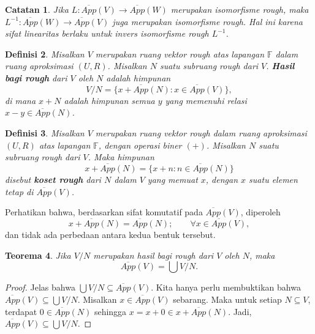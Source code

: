 \documentclass[a4paper,11pt]{article}
\theoremstyle{plain}
\newtheorem{definisi}{Definisi}
\newtheorem{catatan}[definisi]{Catatan}
\newtheorem{teorema}[definisi]{Teorema}
\newcommand{\F}{\mathbb{F}}
\newcommand{\upp}[1]{\overline{App}(#1)}
\begin{document}
\begin{catatan}\label{rem:28}
      Jika $L:\upp{V}\to\upp{W}$ merupakan isomorfisme rough, maka
      $L^{-1}:\upp{W}\to\upp{V}$ juga merupakan isomorfisme rough.
      Hal ini karena sifat linearitas berlaku untuk invers isomorfisme
      rough $L^{-1}$.
\end{catatan}

\begin{definisi}\label{def:29}
      Misalkan $V$ merupakan ruang vektor rough atas lapangan $\F$ dalam
      ruang aproksimasi $(U,R)$. Misalkan $N$ suatu subruang rough dari $V$.
      \textbf{Hasil bagi rough} dari $V$ oleh $N$ adalah himpunan
      \[
            V/N=\{x+\upp{N}:x\in\upp{V}\},
      \]
      di mana $x+N$ adalah himpunan semua $y$ yang memenuhi relasi
      $x-y\in\upp{N}$.
\end{definisi}

\begin{definisi}\label{def:30}
      Misalkan $V$ merupakan ruang vektor rough dalam ruang aproksimasi
      $(U,R)$ atas lapangan $\F$, dengan operasi biner $(+)$. Misalkan
      $N$ suatu subruang rough dari $V$. Maka himpunan
      \[
            x+\upp{N}=\{x+n:n\in\upp{N}\}
      \]
      disebut \textbf{koset rough} dari $N$ dalam $V$ yang memuat $x$,
      dengan $x$ suatu elemen tetap di $\upp{V}$.
\end{definisi}

Perhatikan bahwa, berdasarkan sifat komutatif pada $\upp{V}$,
diperoleh
\[
      x+\upp{N}=\upp{N};\qquad\forall x\in\upp{V},
\]
dan tidak ada perbedaan antara kedua bentuk tersebut.

\begin{teorema}\label{thm:31}
      Jika $V/N$ merupakan hasil bagi rough dari $V$ oleh $N$, maka
      \[
            \upp{V}=\bigcup V/N.
      \]
\end{teorema}
\begin{proof}
      Jelas bahwa $\bigcup V/N\subseteq\upp{V}$. Kita hanya perlu
      membuktikan bahwa $\upp{V}\subseteq\bigcup V/N$. Misalkan
      $x\in\upp{V}$ sebarang. Maka untuk setiap $N\subseteq V$,
      terdapat $0\in\upp{N}$ sehingga $x=x+0\in x+\upp{N}$. Jadi,
      $\upp{V}\subseteq\bigcup V/N$.
\end{proof}
\end{document}
